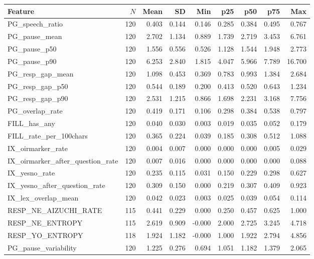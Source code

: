 {\small
\setlength{\tabcolsep}{4pt}
\begin{tabular}{lrrrrrrrr}
\toprule
Feature & $N$ & Mean & SD & Min & p25 & p50 & p75 & Max \\
\midrule
PG\_speech\_ratio & 120 & 0.403 & 0.144 & 0.146 & 0.285 & 0.384 & 0.495 & 0.767 \\
PG\_pause\_mean & 120 & 2.702 & 1.134 & 0.889 & 1.739 & 2.719 & 3.453 & 6.761 \\
PG\_pause\_p50 & 120 & 1.556 & 0.556 & 0.526 & 1.128 & 1.544 & 1.948 & 2.773 \\
PG\_pause\_p90 & 120 & 6.253 & 2.840 & 1.815 & 4.047 & 5.966 & 7.789 & 16.700 \\
PG\_resp\_gap\_mean & 120 & 1.098 & 0.453 & 0.369 & 0.783 & 0.993 & 1.384 & 2.684 \\
PG\_resp\_gap\_p50 & 120 & 0.544 & 0.189 & 0.200 & 0.413 & 0.520 & 0.643 & 1.234 \\
PG\_resp\_gap\_p90 & 120 & 2.531 & 1.215 & 0.866 & 1.698 & 2.231 & 3.168 & 7.756 \\
PG\_overlap\_rate & 120 & 0.419 & 0.171 & 0.106 & 0.298 & 0.384 & 0.538 & 0.797 \\
FILL\_has\_any & 120 & 0.040 & 0.030 & 0.003 & 0.019 & 0.035 & 0.052 & 0.179 \\
FILL\_rate\_per\_100chars & 120 & 0.365 & 0.224 & 0.039 & 0.185 & 0.308 & 0.512 & 1.088 \\
IX\_oirmarker\_rate & 120 & 0.004 & 0.007 & 0.000 & 0.000 & 0.000 & 0.005 & 0.029 \\
IX\_oirmarker\_after\_question\_rate & 120 & 0.007 & 0.016 & 0.000 & 0.000 & 0.000 & 0.000 & 0.088 \\
IX\_yesno\_rate & 120 & 0.235 & 0.115 & 0.031 & 0.150 & 0.229 & 0.298 & 0.627 \\
IX\_yesno\_after\_question\_rate & 120 & 0.309 & 0.150 & 0.000 & 0.219 & 0.307 & 0.409 & 0.923 \\
IX\_lex\_overlap\_mean & 120 & 0.042 & 0.023 & 0.003 & 0.025 & 0.039 & 0.054 & 0.114 \\
RESP\_NE\_AIZUCHI\_RATE & 115 & 0.441 & 0.229 & 0.000 & 0.250 & 0.457 & 0.625 & 1.000 \\
RESP\_NE\_ENTROPY & 115 & 2.619 & 0.909 & -0.000 & 2.000 & 2.725 & 3.245 & 4.718 \\
RESP\_YO\_ENTROPY & 118 & 1.924 & 1.182 & -0.000 & 1.000 & 1.922 & 2.794 & 4.856 \\
PG\_pause\_variability & 120 & 1.225 & 0.276 & 0.694 & 1.051 & 1.182 & 1.379 & 2.065 \\
\bottomrule
\end{tabular}
}

